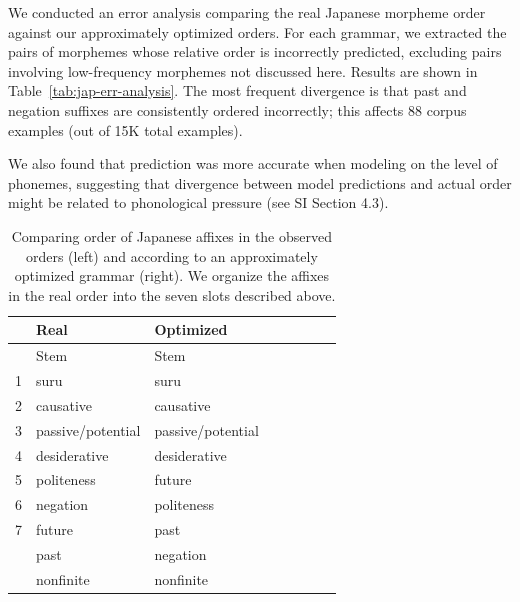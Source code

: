 We conducted an error analysis comparing the real Japanese morpheme order against our approximately optimized orders.
For each grammar, we extracted the pairs of morphemes whose relative order is incorrectly predicted, excluding pairs involving low-frequency morphemes not discussed here. 
Results are shown in Table~\ref{tab:jap-err-analysis}.
The most frequent divergence is that past and negation suffixes are consistently ordered incorrectly; this affects 88 corpus examples (out of 15K total examples).

We also found that prediction was more accurate when modeling on the level of phonemes, suggesting that divergence between model predictions and actual order might be related to phonological pressure (see SI Section 4.3).

\begin{table}
    \centering
    \begin{tabular}{llllllll}
	    &	    Real & Optimized \\ \hline\hline
	    &    Stem & Stem \\ \hline
1 & suru & suru \\
2 & causative & causative \\
3 & passive/potential & passive/potential \\
4 & desiderative & desiderative \\
5 & politeness & future \\
6 & negation & politeness \\
7 & future & past \\
 & past & negation \\
 & nonfinite & nonfinite \\ 
 \hline
    \end{tabular}
    \caption{Comparing order of Japanese affixes in the observed orders (left) and according to an approximately optimized grammar (right). We organize the affixes in the real order into the seven slots described above.}
    \label{tab:grammar-table-jap}
\end{table}

